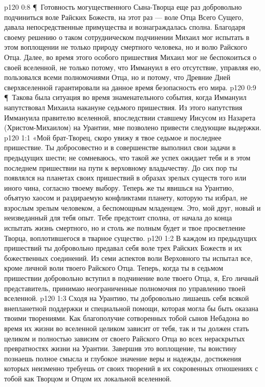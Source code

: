 \vs p120 0:8 \P\ Готовность могущественного Сына\hyp{}Творца еще раз добровольно подчиниться воле Райских Божеств, на этот раз --- воле Отца Всего Сущего, давала непосредственные примущества и вознаграждалась сполна. Благодаря своему решению о таком сотрудническом подчинении Михаил мог испытать в этом воплощении не только природу смертного человека, но и волю Райского Отца. Далее, во время этого особого пришествия Михаил мог не беспокоиться о своей вселенной, не только потому, что Иммануил в его отсутствие, управляя ею, пользовался всеми полномочиями Отца, но и потому, что Древние Дней сверхвселенной гарантировали на данное время безопасность его мира.
\vs p120 0:9 \P\ Такова была ситуация во время знаменательного события, когда Иммануил напутствовал Михаила накануне седьмого пришествия. Из этого напутствия Иммануила правителю вселенной, впоследствии ставшему Иисусом из Назарета (Христом\hyp{}Михаилом) на Урантии, мне позволено привести следующие выдержки.
\vs p120 1:1 «Мой брат\hyp{}Творец, скоро увижу я твое седьмое и последнее пришествие. Ты добросовестно и в совершенстве выполнил свои задачи в предыдущих шести; не сомневаюсь, что такой же успех ожидает тебя и в этом последнем пришествии на пути к верховному владычеству. До сих пор ты появлялся на планетах своих пришествий в образах зрелых существ того или иного чина, согласно твоему выбору. Теперь же ты явишься на Урантию, объятую хаосом и раздираемую конфликтами планету, которую ты избрал, не взрослым зрелым человеком, а беспомощным младенцем. Это, мой друг, новый и неизведанный для тебя опыт. Тебе предстоит сполна, от начала до конца испытать жизнь смертного, но и столь же полным будет и твое просветление Творца, воплотившегося в тварное существо.
\vs p120 1:2 В каждом из предыдущих пришествий ты добровольно предавал себя воле трех Райских Божеств и их божественных соединений. Из семи аспектов воли Верховного ты испытал все, кроме личной воли твоего Райского Отца. Теперь, когда ты в седьмом пришествии добровольно вступил в подчинение воле твоего Отца, я, Его личный представитель, принимаю неограниченные полномочия по управлению твоей вселенной.
\vs p120 1:3 Сходя на Урантию, ты добровольно лишаешь себя всякой внепланетной поддержки и специальной помощи, которая могла бы быть оказана твоими творениями. Как благополучие сотворенных тобой сынов Небадона во время их жизни во вселенной целиком зависит от тебя, так и ты должен стать целиком и полностью зависим от своего Райского Отца во всех нераскрытых превратностях жизни на Урантии. Завершив это воплощение, ты воистину познаешь полное смысла и глубокое значение веры и надежды, достижения которых неизменно требуешь от своих творений в их сокровенных отношениях с тобой как Творцом и Отцом их локальной вселенной.
